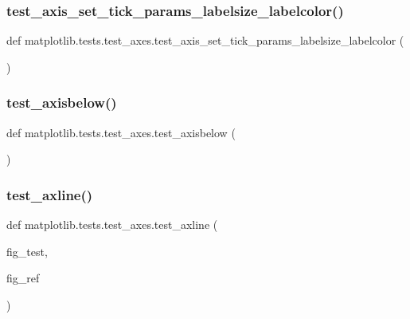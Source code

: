 \subsubsection{\texorpdfstring{test\+\_\+axis\+\_\+set\+\_\+tick\+\_\+params\+\_\+labelsize\+\_\+labelcolor()}{test\_axis\_set\_tick\_params\_labelsize\_labelcolor()}}
{\footnotesize\ttfamily def matplotlib.\+tests.\+test\+\_\+axes.\+test\+\_\+axis\+\_\+set\+\_\+tick\+\_\+params\+\_\+labelsize\+\_\+labelcolor (\begin{DoxyParamCaption}{ }\end{DoxyParamCaption})}

\mbox{\label{namespacematplotlib_1_1tests_1_1test__axes_a3368b658d107a4b51b454cb1b462ffc7}} 
\subsubsection{\texorpdfstring{test\+\_\+axisbelow()}{test\_axisbelow()}}
{\footnotesize\ttfamily def matplotlib.\+tests.\+test\+\_\+axes.\+test\+\_\+axisbelow (\begin{DoxyParamCaption}{ }\end{DoxyParamCaption})}

\mbox{\label{namespacematplotlib_1_1tests_1_1test__axes_a00e1d0c9834335965b98296e2951150e}} 
\subsubsection{\texorpdfstring{test\+\_\+axline()}{test\_axline()}}
{\footnotesize\ttfamily def matplotlib.\+tests.\+test\+\_\+axes.\+test\+\_\+axline (\begin{DoxyParamCaption}\item[{}]{fig\+\_\+test,  }\item[{}]{fig\+\_\+ref }\end{DoxyParamCaption})}

